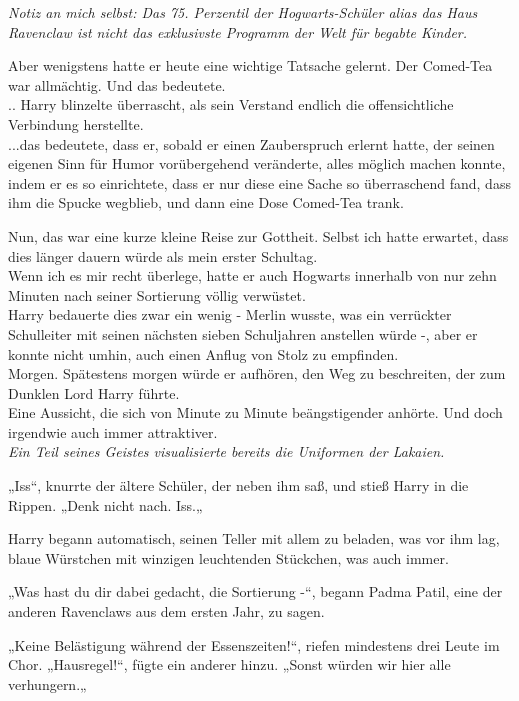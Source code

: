 {\emph{Notiz an mich selbst: Das 75. Perzentil der Hogwarts-Schüler alias das Haus Ravenclaw ist nicht das exklusivste Programm der Welt für begabte Kinder.}

Aber wenigstens hatte er heute eine wichtige Tatsache gelernt. Der Comed-Tea war allmächtig. Und das bedeutete.\\ .. Harry blinzelte überrascht, als sein Verstand endlich die offensichtliche\\ Verbindung herstellte.\\ ...das bedeutete, dass er, sobald er einen Zauberspruch erlernt hatte, der seinen eigenen Sinn für Humor vorübergehend veränderte, alles möglich machen konnte, indem er es so einrichtete, dass er nur diese eine Sache so überraschend fand, dass ihm die Spucke wegblieb, und dann eine Dose Comed-Tea trank.

Nun, das war eine kurze kleine Reise zur Gottheit. Selbst ich hatte erwartet, dass dies länger dauern würde als mein erster Schultag.\\ Wenn ich es mir recht überlege, hatte er auch Hogwarts innerhalb von nur zehn Minuten nach seiner Sortierung völlig verwüstet.\\ Harry bedauerte dies zwar ein wenig - Merlin wusste, was ein verrückter Schulleiter mit seinen nächsten sieben Schuljahren anstellen würde -, aber er konnte nicht umhin, auch einen Anflug von Stolz zu empfinden.\\ Morgen. Spätestens morgen würde er aufhören, den Weg zu beschreiten, der zum Dunklen Lord Harry führte.\\ Eine Aussicht, die sich von Minute zu Minute beängstigender anhörte. Und doch irgendwie auch immer attraktiver.\\ \emph{Ein Teil seines Geistes visualisierte bereits die Uniformen der Lakaien.}

„Iss“, knurrte der ältere Schüler, der neben ihm saß, und stieß Harry in die Rippen. „Denk nicht nach. Iss.„

Harry begann automatisch, seinen Teller mit allem zu beladen, was vor ihm lag, blaue Würstchen mit winzigen leuchtenden Stückchen, was auch immer.

„Was hast du dir dabei gedacht, die Sortierung -“, begann Padma Patil, eine der anderen Ravenclaws aus dem ersten Jahr, zu sagen.

„Keine Belästigung während der Essenszeiten!“, riefen mindestens drei Leute im Chor. „Hausregel!“, fügte ein anderer hinzu. „Sonst würden wir hier alle verhungern.„

}
